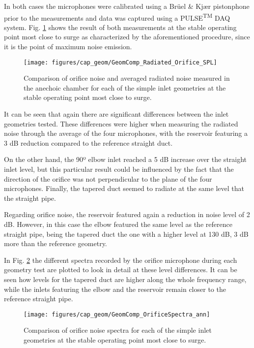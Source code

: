 In both cases the microphones were calibrated using a Brüel \& Kj\ae r pistonphone prior to the measurements and data was captured using a PULSE\textsuperscript{TM} DAQ system. Fig. \ref{fig:Radiated_Orifice_SPL_simple_geom} shows the result of both measurements at the stable operating point most close to surge as characterized by the aforementioned procedure, since it is the point of maximum noise emission.

\begin{figure}[htb!]
\centering
\texttt{[image: figures/cap\_geom/GeomComp\_Radiated\_Orifice\_SPL]}
\caption[Comparison of orifice and radiated noise (simple geom.)]{Comparison of orifice noise and averaged radiated noise measured in the anechoic chamber for each of the simple inlet geometries at the stable operating point most close to surge.}
\label{fig:Radiated_Orifice_SPL_simple_geom}
\end{figure}

It can be seen that again there are significant differences between the inlet geometries tested. These differences were higher when measuring the radiated noise through the average of the four microphones, with the reservoir featuring a 3 dB reduction compared to the reference straight duct. 

On the other hand, the 90º elbow inlet reached a 5 dB increase over the straight inlet level, but this particular result could be influenced by the fact that the direction of the orifice was not perpendicular to the plane of the four microphones. Finally, the tapered duct seemed to radiate at the same level that the straight pipe.

Regarding orifice noise, the reservoir featured again a reduction in noise level of 2 dB. However, in this case the elbow featured the same level as the reference straight pipe, being the tapered duct the one with a higher level at 130 dB, 3 dB more than the reference geometry.

In Fig. \ref{fig:GeomComp_OrificeSpectra_ann} the different spectra recorded by the orifice microphone during each geometry test are plotted to look in detail at these level differences. It can be seen how levels for the tapered duct are higher along the whole frequency range, while the inlets featuring the elbow and the reservoir remain closer to the reference straight pipe.

\begin{figure}[htb!]
\centering
\texttt{[image: figures/cap\_geom/GeomComp\_OrificeSpectra\_ann]}
\caption[Comparison of orifice noise spectra (simple geom.)]{Comparison of orifice noise spectra for each of the simple inlet geometries at the stable operating point most close to surge.}
\label{fig:GeomComp_OrificeSpectra_ann}
\end{figure}

